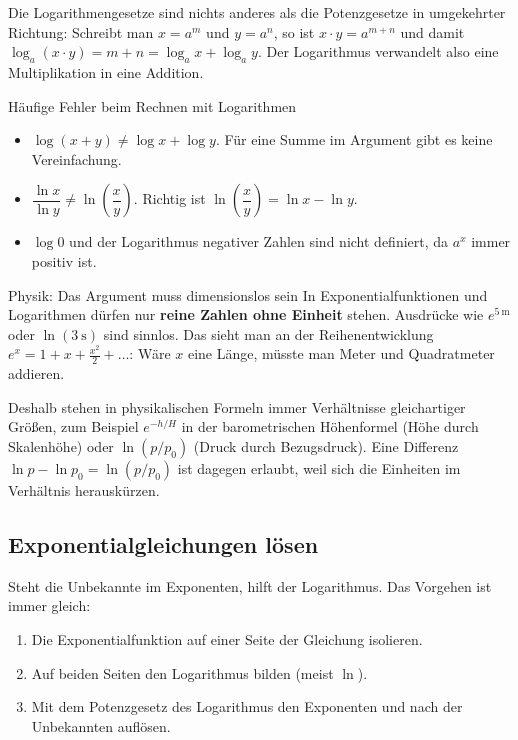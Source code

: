 Die Logarithmengesetze sind nichts anderes als die Potenzgesetze in umgekehrter Richtung: Schreibt man $x = a^m$ und $y = a^n$, so ist $x \cdot y = a^{m+n}$ und damit $\log_a(x \cdot y) = m + n = \log_a x + \log_a y$. Der Logarithmus verwandelt also eine Multiplikation in eine Addition.

\begin{importantbox}[]{Häufige Fehler beim Rechnen mit Logarithmen}
    \begin{itemize}[itemsep=1.5pt]
        \item $\log(x + y) \neq \log x + \log y$. Für eine Summe im Argument gibt es keine Vereinfachung.
        \item $\dfrac{\ln x}{\ln y} \neq \ln\left(\dfrac{x}{y}\right)$. Richtig ist $\ln\left(\dfrac{x}{y}\right) = \ln x - \ln y$.
        \item $\log 0$ und der Logarithmus negativer Zahlen sind nicht definiert, da $a^x$ immer positiv ist.
    \end{itemize}
\end{importantbox}

\begin{importantbox}[]{Physik: Das Argument muss dimensionslos sein}
    In Exponentialfunktionen und Logarithmen dürfen nur \textbf{reine Zahlen ohne Einheit} stehen. Ausdrücke wie $e^{\SI{5}{\meter}}$ oder $\ln(\SI{3}{\second})$ sind sinnlos. Das sieht man an der Reihenentwicklung $e^x = 1 + x + \frac{x^2}{2} + \ldots$: Wäre $x$ eine Länge, müsste man Meter und Quadratmeter addieren.

    Deshalb stehen in physikalischen Formeln immer Verhältnisse gleichartiger Größen, zum Beispiel $e^{-h/H}$ in der barometrischen Höhenformel (Höhe durch Skalenhöhe) oder $\ln(p/p_0)$ (Druck durch Bezugsdruck). Eine Differenz $\ln p - \ln p_0 = \ln(p/p_0)$ ist dagegen erlaubt, weil sich die Einheiten im Verhältnis herauskürzen.
\end{importantbox}

\subsection{Exponentialgleichungen lösen}\label{subsec: exponentialgleichungen}
Steht die Unbekannte im Exponenten, hilft der Logarithmus. Das Vorgehen ist immer gleich:
\begin{enumerate}[itemsep=1.5pt]
    \item Die Exponentialfunktion auf einer Seite der Gleichung isolieren.
    \item Auf beiden Seiten den Logarithmus bilden (meist $\ln$).
    \item Mit dem Potenzgesetz des Logarithmus den Exponenten  und nach der Unbekannten auflösen.
\end{enumerate}

